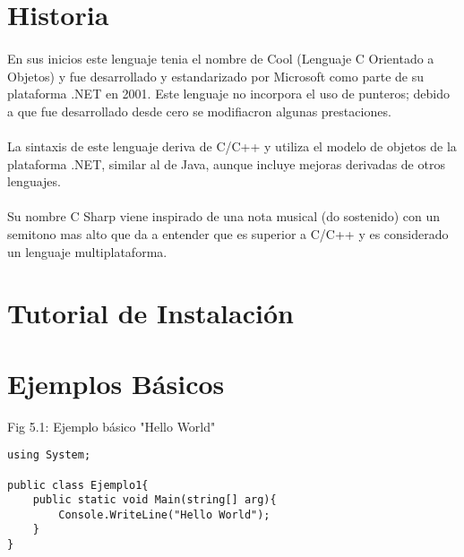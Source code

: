 \documentclass[11pt]{article} %
\begin{document}
\section{Historia}
\paragraph{ }
En sus inicios este lenguaje tenia el nombre de Cool (Lenguaje C Orientado a Objetos) y fue desarrollado y estandarizado por Microsoft como parte de su plataforma .NET en 2001. Este lenguaje no incorpora el uso de punteros; debido a que fue desarrollado desde cero se modifiacron algunas prestaciones.
\paragraph{ }
La sintaxis de este lenguaje deriva de C/C++ y utiliza el modelo de objetos de la plataforma .NET, similar al de Java, aunque incluye mejoras derivadas de otros lenguajes.
\paragraph{ }
Su nombre C Sharp viene inspirado de una nota musical (do sostenido) con un semitono mas alto que da a entender que es superior a  C/C++ y es considerado un lenguaje multiplataforma.

\section{Tutorial de Instalación}


\section{Ejemplos Básicos}


Fig 5.1: Ejemplo básico "Hello World"
\lstset{style=sharpc}
\begin{lstlisting}[frame=single]
using System;

public class Ejemplo1{
	public static void Main(string[] arg){
		Console.WriteLine("Hello World");
	}
}
\end{lstlisting}
\end{document}
